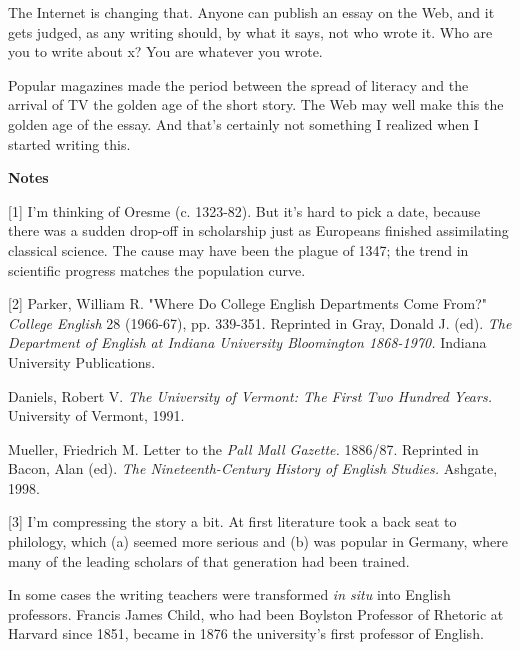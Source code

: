 The Internet is changing that.
                  Anyone can publish an essay on the Web, and it gets judged, as
                  any writing should, by what it says, not who wrote it. Who are
                  you to write about x? You are whatever you wrote.

Popular
                  magazines made the period between the spread of literacy and
                  the arrival of TV the golden age of the short story. The Web
                  may well make this the golden age of the essay. And that's
                  certainly not something I realized when I started writing
                  this.



\textbf{Notes}

[1] I'm
                  thinking of Oresme (c. 1323-82). But it's hard to pick a date,
                  because there was a sudden drop-off in scholarship just as
                  Europeans finished assimilating classical science. The cause
                  may have been the plague of 1347; the trend in scientific
                  progress matches the population curve.

[2] Parker,
                  William R. "Where Do College English Departments Come From?"
                  \emph{College English} 28 (1966-67), pp. 339-351. Reprinted in
                  Gray, Donald J. (ed).
                  \emph{The Department of English at Indiana University Bloomington
                    1868-1970.}
                  Indiana University Publications.

Daniels, Robert V.
                  \emph{The University of Vermont: The First Two Hundred Years.}
                  University of Vermont, 1991.

Mueller, Friedrich M.
                  Letter to the \emph{Pall Mall Gazette.} 1886/87. Reprinted in
                  Bacon, Alan (ed).
                  \emph{The Nineteenth-Century History of English Studies.}
                  Ashgate, 1998.

[3] I'm compressing the story a bit.
                  At first literature took a back seat to philology, which (a)
                  seemed more serious and (b) was popular in Germany, where many
                  of the leading scholars of that generation had been
                  trained.

In some cases the writing teachers were
                  transformed \emph{in situ} into English professors. Francis
                  James Child, who had been Boylston Professor of Rhetoric at
                  Harvard since 1851, became in 1876 the university's first
                  professor of English.

